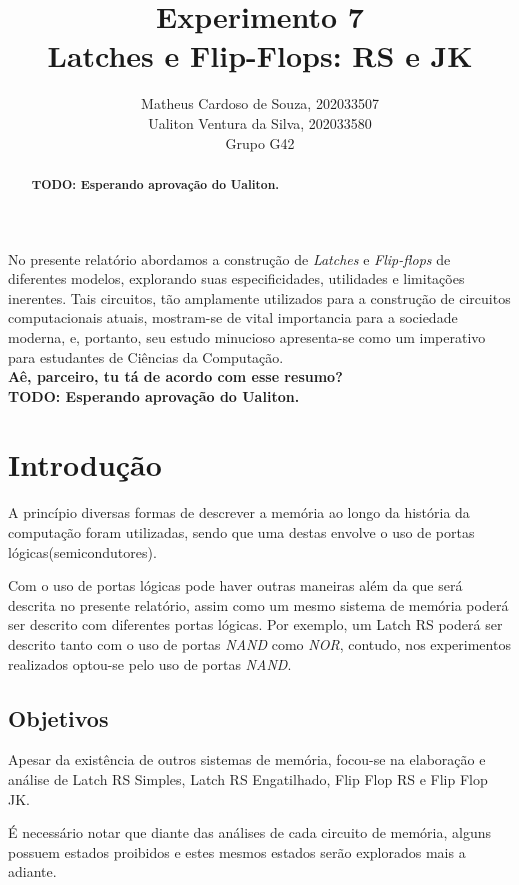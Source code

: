 \documentclass[12pt]{article}
\title{Experimento 7\\
Latches e Flip-Flops: RS e JK}
\author{Matheus Cardoso de Souza, 202033507\\
        Ualiton Ventura da Silva, 202033580\\
        Grupo G42
}
\begin{document}
\maketitle

 \begin{abstract}
   \textbf{TODO: Esperando aprovação do Ualiton.}
 \end{abstract}

 \begin{resumo}
   No presente relatório abordamos a construção de \emph{Latches} e
   \emph{Flip-flops} de diferentes modelos, explorando suas especificidades,
   utilidades e limitações inerentes. Tais circuitos, tão amplamente utilizados
   para a construção de circuitos computacionais atuais, mostram-se de vital
   importancia para a sociedade moderna, e, portanto, seu estudo minucioso
   apresenta-se como um imperativo para estudantes de Ciências da Computação.
   \\
   \textbf{Aê, parceiro, tu tá de acordo com esse resumo?}\\
   \textbf{TODO: Esperando aprovação do Ualiton.}\\
 \end{resumo}


\section{Introdução}\label{sec:Introducao}

A princípio diversas formas de descrever a memória ao longo da história da computação foram utilizadas, sendo que uma destas envolve o uso de portas lógicas(semicondutores).

Com o uso de portas lógicas pode haver outras maneiras além da que será descrita
no presente relatório, assim como um mesmo sistema de memória poderá ser
descrito com diferentes portas lógicas. Por exemplo, um Latch RS poderá ser
descrito tanto com o uso de portas \emph{NAND} como \emph{NOR}, contudo, nos
experimentos realizados optou-se pelo uso de portas \emph{NAND}.

\subsection{Objetivos}\label{sec:Objetivos}
Apesar da existência de outros sistemas de memória, focou-se na elaboração e
análise de Latch RS Simples, Latch RS Engatilhado, Flip Flop RS e Flip Flop JK.

É necessário notar que diante das análises de cada circuito de memória, alguns
possuem estados proibidos e estes mesmos estados serão explorados mais a
adiante.
\end{document}
